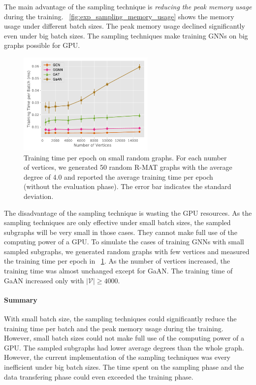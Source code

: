 The main advantage of the sampling technique is \emph{reducing the peak memory usage} during the training.
\figurename~\ref{fig:exp_sampling_memory_usage} shows the memory usage under different batch sizes.
The peak memory usage declined significantly even under big batch sizes.
The sampling techniques make training GNNs on big graphs possible for GPU.

\begin{figure}
    \centering
    \includegraphics[height=5cm]{figs/experiments/exp_small_graph_train_time.pdf}
    \caption{Training time per epoch on small random graphs. For each number of vertices, we generated 50 random R-MAT graphs with the average degree of 4.0 and reported the average training time per epoch (without the evaluation phase). The error bar indicates the standard deviation.}
    \label{fig:exp_small_graph_train_time}
\end{figure}

The disadvantage of the sampling technique is wasting the GPU resources.
As the sampling techniques are only effective under small batch sizes, the sampled subgraphs will be very small in those cases.
They cannot make full use of the computing power of a GPU.
To simulate the cases of training GNNs with small sampled subgraphs, we generated random graphs with few vertices and measured the training time per epoch in \figurename~\ref{fig:exp_small_graph_train_time}.
As the number of vertices increased, the training time was almost unchanged except for GaAN.
The training time of GaAN increased only with $|\mathcal{V}| \geq 4000$.


\paragraph{Summary}
With small batch size, the sampling techniques could significantly reduce the training time per batch and the peak memory usage during the training.
However, small batch sizes could not make full use of the computing power of a GPU.
The sampled subgraphs had lower average degrees than the whole graph.
However, the current implementation of the sampling techniques was every inefficient under big batch sizes.
The time spent on the sampling phase and the data transfering phase could even exceeded the training phase.